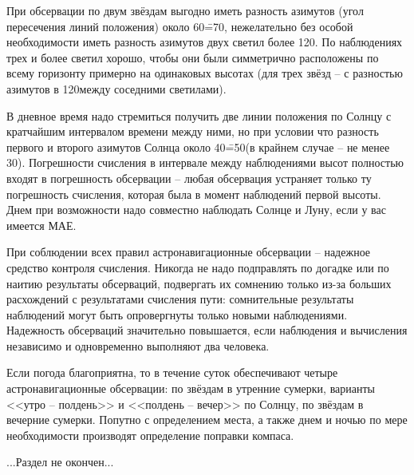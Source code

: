 При обсервации по двум звёздам выгодно иметь разность азимутов (угол
пересечения линий положения) около 60\==70\gr, нежелательно без особой
необходимости иметь разность азимутов двух светил более 120\gr. По
наблюдениях трех и более светил хорошо, чтобы они были симметрично
расположены по всему горизонту примерно на одинаковых высотах (для
трех звёзд \--- с разностью азимутов в 120\gr между соседними светилами).

В дневное время надо стремиться получить две линии положения по Солнцу
с кратчайшим интервалом времени между ними, но при условии что
разность первого и второго азимутов Солнца около 40\==50\gr (в крайнем
случае \--- не менее 30\gr). Погрешности счисления в интервале между
наблюдениями высот полностью входят в погрешность обсервации \--- любая
обсервация устраняет только ту погрешность счисления, которая была в
момент наблюдений первой высоты. Днем при возможности надо совместно
наблюдать Солнце и Луну, если у вас имеется МАЕ.

При соблюдении всех правил астронавигационные обсервации \--- надежное
средство контроля счисления. Никогда не надо подправлять по догадке
или по наитию результаты обсерваций, подвергать их сомнению только
из-за больших расхождений с результатами счисления пути: сомнительные
результаты наблюдений могут быть опровергнуты только новыми
наблюдениями. Надежность обсерваций значительно повышается, если
наблюдения и вычисления независимо и одновременно выполняют два
человека.

Если погода благоприятна, то в течение суток обеспечивают четыре
астронавигационные обсервации: по звёздам в утренние сумерки, варианты
<<утро \--- полдень>> и <<полдень \--- вечер>> по Солнцу, по звёздам в
вечерние сумерки. Попутно с определением места, а также днем и ночью
по мере необходимости производят определение поправки компаса.


...Раздел не окончен...

\onecolumn

